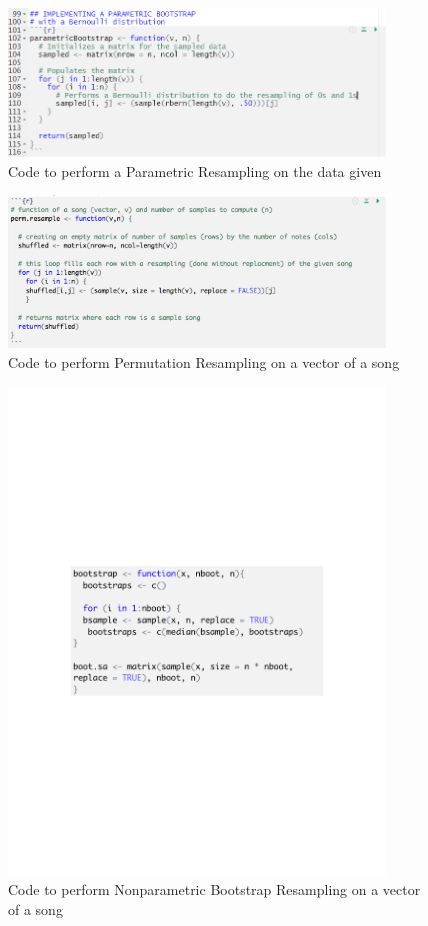 \documentclass[12pt, letterpaper]{article}
\begin{document}
\begin{figure}[!hb]
\centering
\includegraphics[width=10cm]{ParametricBootstrapCode.png}
\caption{Code to perform a Parametric Resampling on the data given}
\label{fig: Parametric Bootstrap Code}
\end{figure}

\begin{figure}[!hb]
\centering
\includegraphics[width=10cm]{PermutationResamplingCode.png}
\caption{Code to perform Permutation Resampling on a vector of a song}
\label{fig: Permutation Resampling Code}
\end{figure}

\begin{figure}[!hb]
\centering
\includegraphics[width=10cm]{BootstrapCode.pdf}
\caption{Code to perform Nonparametric Bootstrap Resampling on a vector of a song}
\label{fig: Permutation Resampling Code}
\end{figure}
\end{document}
